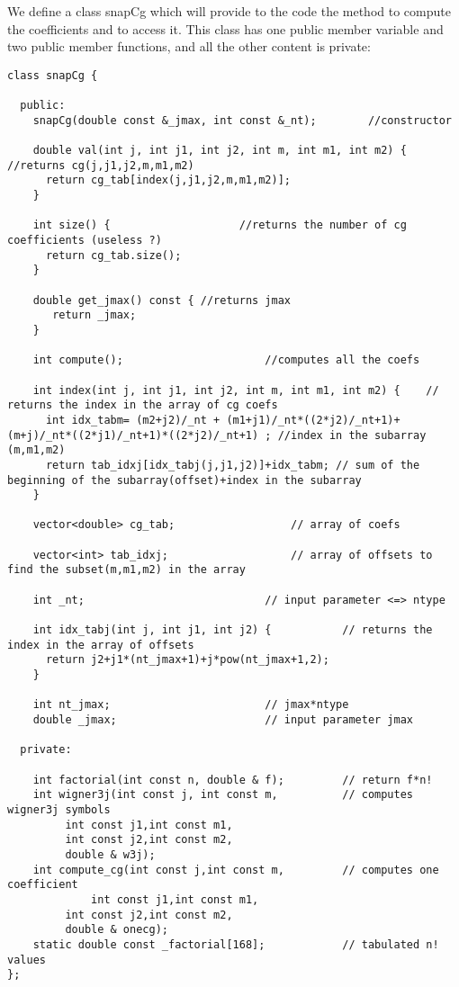 \documentclass[12pt]{article}
\begin{document}
        We define a class snapCg which will provide to the code the method to compute the coefficients and to access it. This class has one public member variable and two public member functions, and all the other content is private:\\
	\begin{lstlisting}
class snapCg {

  public:
    snapCg(double const &_jmax, int const &_nt);		//constructor

    double val(int j, int j1, int j2, int m, int m1, int m2) {  //returns cg(j,j1,j2,m,m1,m2)
      return cg_tab[index(j,j1,j2,m,m1,m2)];
    }

    int size() { 					//returns the number of cg coefficients (useless ?)
      return cg_tab.size();
    }

    double get_jmax() const { //returns jmax
       return _jmax;
    }

    int compute(); 					 	//computes all the coefs

    int index(int j, int j1, int j2, int m, int m1, int m2) {    // returns the index in the array of cg coefs
      int idx_tabm= (m2+j2)/_nt + (m1+j1)/_nt*((2*j2)/_nt+1)+(m+j)/_nt*((2*j1)/_nt+1)*((2*j2)/_nt+1) ; //index in the subarray (m,m1,m2)
      return tab_idxj[idx_tabj(j,j1,j2)]+idx_tabm; // sum of the beginning of the subarray(offset)+index in the subarray
    }

    vector<double> cg_tab;					// array of coefs

    vector<int> tab_idxj;					// array of offsets to find the subset(m,m1,m2) in the array

    int _nt;							// input parameter <=> ntype

    int idx_tabj(int j, int j1, int j2) {			// returns the index in the array of offsets 
      return j2+j1*(nt_jmax+1)+j*pow(nt_jmax+1,2);
    }

    int nt_jmax;						// jmax*ntype
    double _jmax;						// input parameter jmax

  private:

    int factorial(int const n, double & f);			// return f*n!
    int wigner3j(int const j, int const m,			// computes wigner3j symbols
		 int const j1,int const m1,
		 int const j2,int const m2,
		 double & w3j);
    int compute_cg(int const j,int const m,			// computes one coefficient
	       	 int const j1,int const m1,
		 int const j2,int const m2,
		 double & onecg);
    static double const _factorial[168];			// tabulated n! values
};
	\end{lstlisting}
\end{document}
